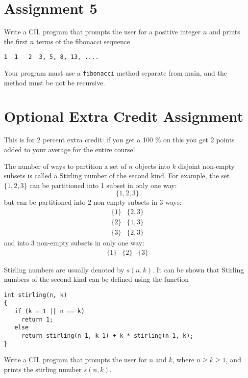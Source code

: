 \documentclass[10pt,a4paper]{amsart}
\begin{document}
\section{Assignment 5}

Write a CIL program that prompts the user for a positive integer $n$ and prints the 
first $n$ terms of the fibonacci sequence
\begin{verbatim}
1  1   2  3, 5, 8, 13, ....
\end{verbatim}
Your program must use a {\tt fibonacci} method separate from main, and the method must be 
not be recursive.



\section{Optional Extra Credit Assignment}
This is for 2 percent extra credit: if you get a 100 \% on this you get 2 points added to your 
average for the entire course!

The number of ways to partition a set of $n$ objects into $k$ disjoint non-empty subsets is called
a Stirling number of the second kind. For example, the set $ \{1, 2, 3\}$ can be partitioned into 1 subset in only
one way:
$$\{1, 2, 3\}$$
but can be partitioned into 2 non-empty subsets in 3 ways:
$$ 
\begin{array}{cc}
\{1\} & \{2, 3\} \\
\{2\} & \{1, 3\} \\
\{3\} & \{2, 3\}
\end{array}
$$
and into 3 non-empty subsets in only one way:
$$ \begin{array}{ccc} \{1\}  & \{2\} & \{3\} \end{array}$$

Stirling numbers are usually denoted by $s(n, k)$.
It can be shown that Stirling numbers of the second kind can be defined using the function

\begin{verbatim}
int stirling(n, k)
{
   if (k = 1 || n == k)
     return 1;
   else 
     return stirling(n-1, k-1) + k * stirling(n-1, k);
}
\end{verbatim}

Write a CIL program that prompts the user for $n$ and $k$, where $n \ge k \ge 1$, and 
prints the stirling number $s(n, k)$.
\end{document}
